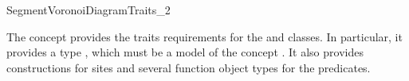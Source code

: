



\begin{ccRefConcept}{SegmentVoronoiDiagramTraits_2}

\ccDefinition

The concept  provides the traits
requirements for the  and
 classes. In
particular, it provides a type , which must be a model of
the concept . It also provides
constructions for sites and several function object
types for the predicates.


\end{ccRefConcept}
